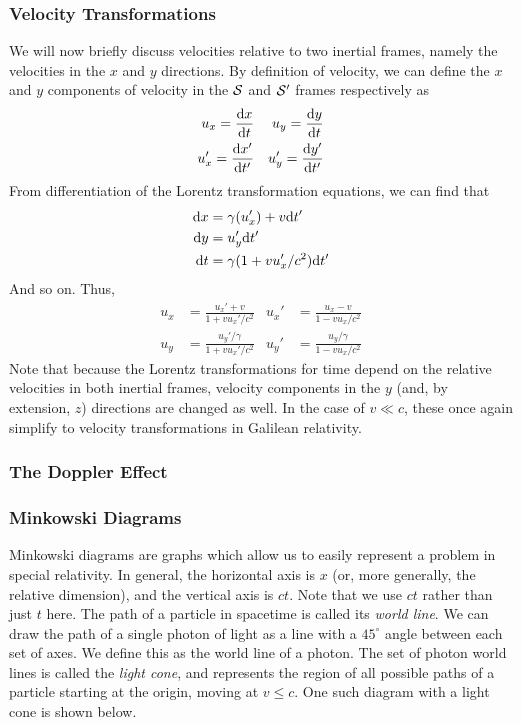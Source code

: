 \documentclass[a4paper]{article}
\begin{document}
\subsubsection{Velocity Transformations}
We will now briefly discuss velocities relative to two inertial frames, namely
the velocities in the $x$ and $y$ directions. By definition of velocity, we can
define the $x$ and $y$ components of velocity in the $\S$ and $\S'$ frames
respectively as
\begin{align*}
	u_x = \der{x}{t} && u_y = \der{y}{t}\\
	u_x' = \der{x'}{t'} && u_y' = \der{y'}{t'}
\end{align*}
From differentiation of the Lorentz transformation equations, we can find that
\begin{align*}
	\d x &= \gamma(u_x')+v\d t'\\
	\d y &= u_y'\d t'\\
	\d t &= \gamma(1 + vu_x'/c^2)\d t'
\end{align*}
And so on. Thus,
\begin{align*}
	u_x &= \frac{u_x' + v}{1+vu_x'/c^2} &
		u_x' &= \frac{u_x-v}{1-vu_x/c^2}\\
	u_y &= \frac{u_y'/\gamma}{1+vu_x'/c^2} &
		u_y' &= \frac{u_y/\gamma}{1-vu_x/c^2}
\end{align*}
Note that because the Lorentz transformations for time depend on the relative
velocities in both inertial frames, velocity components in the $y$
(and, by extension, $z$) directions are changed as well. In the case of
$v\ll c$, these once again simplify to velocity transformations in Galilean
relativity.

\subsubsection{The Doppler Effect}


\subsubsection{Minkowski Diagrams}
Minkowski diagrams are graphs which allow us to easily represent a problem
in special relativity. In general, the horizontal axis is $x$ (or, more
generally, the relative dimension), and the vertical axis is $ct$. Note that
we use $ct$ rather than just $t$ here.
The path of a particle in spacetime is called its \emph{world line}.
We can draw the path of a single photon of light as a line with a $45^\circ$
angle between each set of axes. We define this as the world line of a photon.
The set of photon world lines is called the \emph{light cone}, and represents
the region of all possible paths of a particle starting at the origin, moving
at $v\leq c$. One
such diagram with a light cone is shown below.
\end{document}
